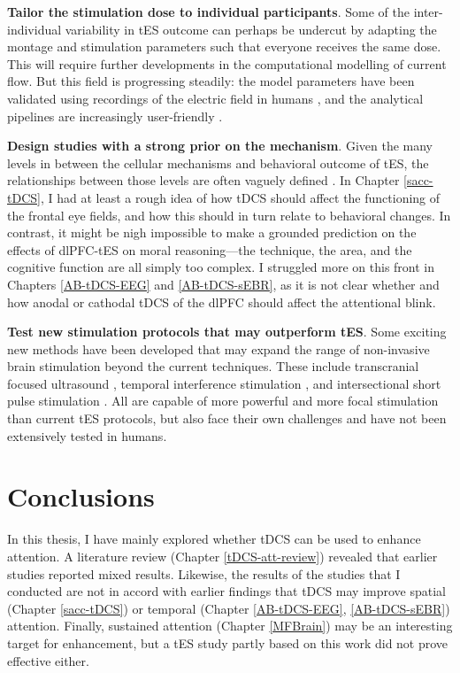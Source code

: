 \documentclass[11pt,]{memoir}
\begin{document}
\textbf{Tailor the stimulation dose to individual participants}. Some of the inter-individual variability in tES outcome can perhaps be undercut by adapting the montage and stimulation parameters such that everyone receives the same dose. This will require further developments in the computational modelling of current flow. But this field is progressing steadily: the model parameters have been validated using recordings of the electric field in humans \autocites{Huang2017}{Opitz2016}, and the analytical pipelines are increasingly user-friendly \autocites{Saturnino2018}{Huang2018}.

\textbf{Design studies with a strong prior on the mechanism}. Given the many levels in between the cellular mechanisms and behavioral outcome of tES, the relationships between those levels are often vaguely defined \autocite{Bestmann2014}. In Chapter \ref{sacc-tDCS}, I had at least a rough idea of how tDCS should affect the functioning of the frontal eye fields, and how this should in turn relate to behavioral changes. In contrast, it might be nigh impossible to make a grounded prediction on the effects of dlPFC-tES on moral reasoning---the technique, the area, and the cognitive function are all simply too complex. I struggled more on this front in Chapters \ref{AB-tDCS-EEG} and \ref{AB-tDCS-sEBR}, as it is not clear whether and how anodal or cathodal tDCS of the dlPFC should affect the attentional blink.

\textbf{Test new stimulation protocols that may outperform tES}. Some exciting new methods have been developed that may expand the range of non-invasive brain stimulation beyond the current techniques. These include transcranial focused ultrasound \autocites{Folloni2019}{Verhagen2019}, temporal interference stimulation \autocite{Grossman2017}, and intersectional short pulse stimulation \autocite{Voroslakos2018}. All are capable of more powerful and more focal stimulation than current tES protocols, but also face their own challenges and have not been extensively tested in humans.

\hypertarget{conclusions-1}{%
\section{Conclusions}\label{conclusions-1}}

In this thesis, I have mainly explored whether tDCS can be used to enhance attention. A literature review (Chapter \ref{tDCS-att-review}) revealed that earlier studies reported mixed results. Likewise, the results of the studies that I conducted are not in accord with earlier findings that tDCS may improve spatial (Chapter \ref{sacc-tDCS}) or temporal (Chapter \ref{AB-tDCS-EEG}, \ref{AB-tDCS-sEBR}) attention. Finally, sustained attention (Chapter \ref{MFBrain}) may be an interesting target for enhancement, but a tES study partly based on this work \autocite{VanSchouwenburg2019} did not prove effective either.
\end{document}
